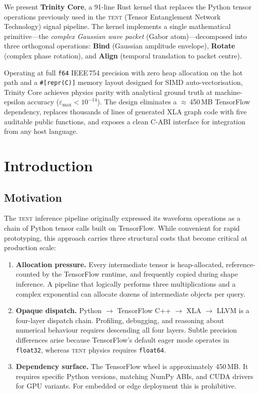 \documentclass[11pt,a4paper]{article}
\theoremstyle{definition}
\newcommand{\TENT}{\textsc{tent}}
\newcommand{\CB}[1]{\texttt{#1}}
\begin{document}
We present \textbf{Trinity Core}, a 91-line Rust kernel that replaces
the Python tensor operations previously used in the \TENT{}
(Tensor Entanglement Network Technology) signal pipeline.
The kernel implements a single mathematical primitive---the
\emph{complex Gaussian wave packet} (Gabor atom)---decomposed into three
orthogonal operations: \textbf{Bind} (Gaussian amplitude envelope),
\textbf{Rotate} (complex phase rotation), and \textbf{Align}
(temporal translation to packet centre).

Operating at full \CB{f64} IEEE\,754 precision with zero heap allocation
on the hot path and a \CB{\#[repr(C)]} memory layout designed for SIMD
auto-vectorisation, Trinity Core achieves physics parity with analytical
ground truth at machine-epsilon accuracy ($\varepsilon_{\max} < 10^{-14}$).
The design eliminates a $\approx$\,450\,MB TensorFlow dependency,
replaces thousands of lines of generated XLA graph code with five
auditable public functions, and exposes a clean C-ABI interface for
integration from any host language.

\section{Introduction}

\subsection{Motivation}

The \TENT{} inference pipeline originally expressed its waveform
operations as a chain of Python tensor calls built on TensorFlow.
While convenient for rapid prototyping, this approach carries three
structural costs that become critical at production scale:

\begin{enumerate}
  \item \textbf{Allocation pressure.}
        Every intermediate tensor is heap-allocated, reference-counted
        by the TensorFlow runtime, and frequently copied during shape
        inference.  A pipeline that logically performs three
        multiplications and a complex exponential can allocate dozens of
        intermediate objects per query.

  \item \textbf{Opaque dispatch.}
        Python $\to$ TensorFlow C++ $\to$ XLA $\to$ LLVM is a
        four-layer dispatch chain.  Profiling, debugging, and reasoning
        about numerical behaviour requires descending all four layers.
        Subtle precision differences arise because TensorFlow's default
        eager mode operates in \CB{float32}, whereas \TENT{} physics
        requires \CB{float64}.

  \item \textbf{Dependency surface.}
        The TensorFlow wheel is approximately 450\,MB.  It requires
        specific Python versions, matching NumPy ABIs, and CUDA drivers
        for GPU variants.  For embedded or edge deployment this is
        prohibitive.
\end{enumerate}
\end{document}
